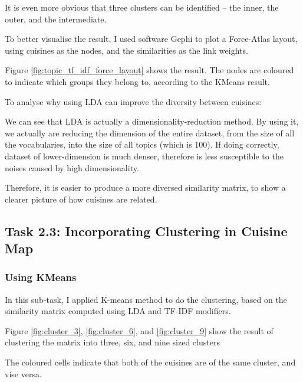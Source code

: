 \documentclass[11pt]{article}
\begin{document}
It is even more obvious that three clusters can be identified -- the inner, the outer, and the intermediate.
\vspace{1em}

To better visualise the result, I used software Gephi to plot a Force-Atlas layout, using cuisines as the nodes, and the similarities as the link weights.

Figure \ref{fig:topic_tf_idf_force_layout} shows the result. The nodes are coloured to indicate which groups they belong to, according to the KMeans result.

\vspace{1em}

To analyse why using LDA can improve the diversity between cuisines:

We can see that LDA is actually a dimensionality-reduction method.
By using it, we actually are reducing the dimension of the entire dataset, from the size of all the vocabularies, into the size of all topics (which is 100).
If doing correctly, dataset of lower-dimension is much denser, therefore is less susceptible to the noises caused by high dimensionality.

Therefore, it is easier to produce a more diversed similarity matrix, to show a clearer picture of how cuisines are related.


\subsection{Task 2.3: Incorporating Clustering in Cuisine Map}
\subsubsection{Using KMeans}

In this sub-task, I applied K-means method to do the clustering, based on the similarity matrix computed using LDA and TF-IDF modifiers.

\vspace{1em}
Figure \ref{fig:cluster_3}, \ref{fig:cluster_6}, and \ref{fig:cluster_9} show the result of clustering the matrix into three, six, and nine sized clusters

The coloured cells indicate that both of the cuisines are of the same cluster, and vise versa.
\end{document}
